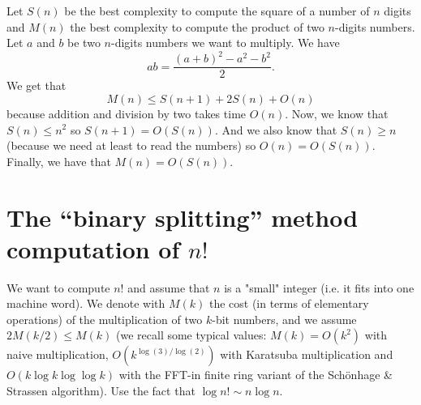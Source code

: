 \documentclass[11pt]{exam}
\theoremstyle{definition}
\begin{document}
\begin{solution}
Let $S(n)$ be the best complexity to compute the square of a number of $n$ digits and $M(n)$ the best complexity to compute the product of two $n$-digits numbers.
Let $a$ and $b$ be two $n$-digits numbers we want to multiply. We have 
$$ab = \frac{(a+b)^2 - a^2 - b^2}{2}.$$
We get that
$$ M(n) \leq S(n+1) + 2 S(n) + O(n)$$
because addition and division by two takes time $O(n)$. Now, we know that $S(n) \leq n^2$ so $S(n+1) = O(S(n))$. And we also know that $S(n) \geq n$ (because we need at least to read the numbers) so $O(n) = O(S(n))$.
Finally, we have that $M(n) = O(S(n))$.
\end{solution}

\section{The ``binary splitting'' method computation of $n!$}

We want to compute $n!$ and assume that $n$ is a "small" integer (i.e. it fits into one machine word). We denote with $M(k)$ the cost (in terms of elementary operations) of the multiplication of two $k$-bit numbers, and we assume $2M(k/2)\leqslant M(k)$ (we recall some typical values: $M(k)=O(k^2)$ with naive multiplication, $O(k^{\log(3)/\log(2)})$ with Karatsuba multiplication and $O(k\log k\log\log k)$ with the FFT-in finite ring variant of the Sch\"{o}nhage \& Strassen algorithm). Use the fact that $\log n! \sim n\log n$.
\end{document}
